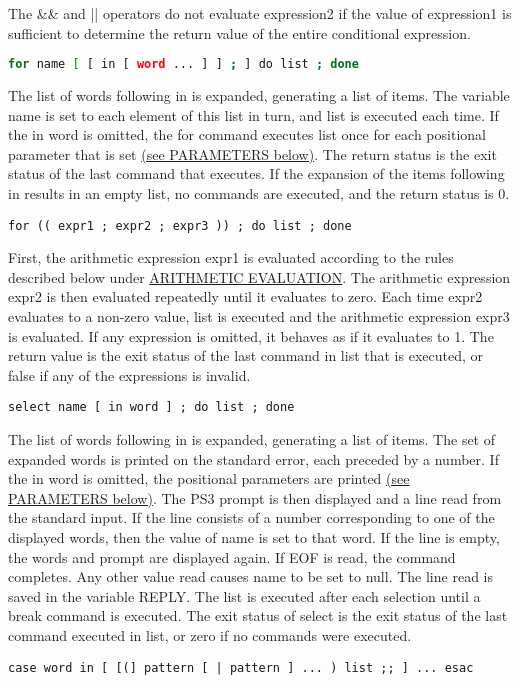The \&\& and || operators do not evaluate expression2 if the value of expression1 is sufficient to determine the return value of the entire conditional expression.
\begin{lstlisting}[language=bash]
for name [ [ in [ word ... ] ] ; ] do list ; done
\end{lstlisting}
The list of words following in is expanded, generating a list of items. The variable name is set to each element of this list in turn, and list is executed each time. If the in word is omitted, the for command executes list once for each positional parameter that is set \hyperref[sec:parameters]{(see PARAMETERS below)}. The return status is the exit status of the last command that executes. If the expansion of the items following in results in an empty list, no commands are executed, and the return status is 0.
\begin{lstlisting}
for (( expr1 ; expr2 ; expr3 )) ; do list ; done
\end{lstlisting}
First, the arithmetic expression expr1 is evaluated according to the rules described below under \hyperref[sec:arithmeticevaluation]{ARITHMETIC EVALUATION}. The arithmetic expression expr2 is then evaluated repeatedly until it evaluates to zero. Each time expr2 evaluates to a non-zero value, list is executed and the arithmetic expression expr3 is evaluated. If any expression is omitted, it behaves as if it evaluates to 1. The return value is the exit status of the last command in list that is executed, or false if any of the expressions is invalid.
\begin{lstlisting}
select name [ in word ] ; do list ; done
\end{lstlisting}
The list of words following in is expanded, generating a list of items. The set of expanded words is printed on the standard error, each preceded by a number. If the in word is omitted, the positional parameters are printed \hyperref[sec:parameters]{(see PARAMETERS below)}. The PS3 prompt is then displayed and a line read from the standard input. If the line consists of a number corresponding to one of the displayed words, then the value of name is set to that word. If the line is empty, the words and prompt are displayed again. If EOF is read, the command completes. Any other value read causes name to be set to null. The line read is saved in the variable REPLY. The list is executed after each selection until a break command is executed. The exit status of select is the exit status of the last command executed in list, or zero if no commands were executed.
\begin{lstlisting}
case word in [ [(] pattern [ | pattern ] ... ) list ;; ] ... esac
\end{lstlisting}

